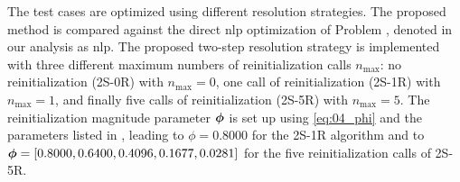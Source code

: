 The test cases are optimized using different resolution strategies. The proposed method is compared against the direct \gls{nlp} optimization of Problem , denoted in our analysis as \gls{nlp}. The proposed two-step resolution strategy is implemented with three different maximum numbers of reinitialization calls $n_{\text{max}}$: no reinitialization (2S-0R) with $n_{\text{max}}=0$, one call of reinitialization (2S-1R) with $n_{\text{max}}=1$, and finally five calls of reinitialization (2S-5R) with $n_{\text{max}}=5$. The reinitialization magnitude parameter $\bm{\phi}$ is set up using \eqref{eq:04_phi} and the parameters listed in , leading to $\phi = 0.8000$ for the 2S-1R algorithm and to $\bm{\phi} = \left[ 0.8000, 0.6400, 0.4096, 0.1677, 0.0281 \right]$ for the five reinitialization calls of 2S-5R.

